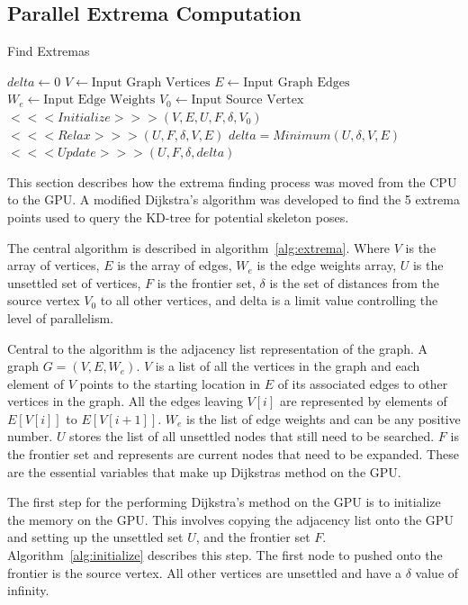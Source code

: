 \documentclass[conference]{IEEEtran}
\begin{document}
\subsection{Parallel Extrema Computation}
\label{sec:extrema}
\begin{algorithm}
\caption{Find Extremas}
\label{alg:extrema}
  \begin{algorithmic}[1]
    \STATE $delta \leftarrow 0$
    \STATE $V \leftarrow \text{Input Graph Vertices}$
    \STATE $E \leftarrow \text{Input Graph Edges}$
    \STATE $W_{e} \leftarrow \text{Input Edge Weights}$
    \STATE $V_{0} \leftarrow \text{Input Source Vertex}$
    \STATE $<<<Initialize>>>(V, E, U, F, \delta, V_{0})$
    \STATE $<<<Relax>>>(U, F, \delta, V, E)$
    \STATE $delta = Minimum(U, \delta, V, E)$
    \STATE $<<<Update>>>(U, F, \delta, delta)$
    \ENDWHILE
  \end{algorithmic}
\end{algorithm}
This section describes how the extrema finding process was moved from the CPU to the GPU. A modified Dijkstra's algorithm was developed to find the 5 extrema points used to query the KD-tree for potential skeleton poses.

The central algorithm is described in algorithm~\ref{alg:extrema}. Where $V$ is the array of vertices, $E$ is the array of edges, $W_{e}$ is the edge weights array, $U$ is the unsettled set of vertices, $F$ is the frontier set, $\delta$ is the set of distances from the source vertex $V_{0}$ to all other vertices, and delta is a limit value controlling the level of parallelism.

Central to the algorithm is the adjacency list representation of the graph. A graph $G = (V, E, W_{e})$. $V$ is a list of all the vertices in the graph and each element of $V$ points to the starting location in $E$ of its associated edges to other vertices in the graph. All the edges leaving $V[i]$ are represented by elements of $E[V[i]]$ to $E[V[i+1]]$. $W_{e}$ is the list of edge weights and can be any positive number. $U$ stores the list of all unsettled nodes that still need to be searched. $F$ is the frontier set and represents are current nodes that need to be expanded. These are the essential variables that make up Dijkstras method on the GPU.

The first step for the performing Dijkstra's method on the GPU is to initialize the memory on the GPU. This involves copying the adjacency list onto the GPU and setting up the unsettled set $U$, and the frontier set $F$. Algorithm~\ref{alg:initialize} describes this step. The first node to pushed onto the frontier is the source vertex. All other vertices are unsettled and have a $\delta$ value of infinity.
\end{document}
